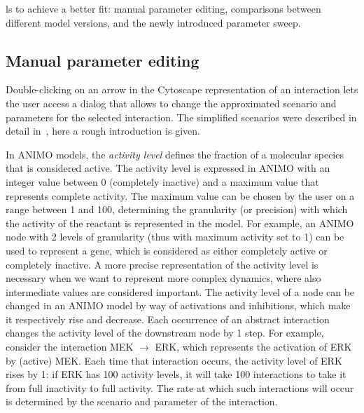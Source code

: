 \documentclass[submission,copyright,creativecommons]{eptcs}
\begin{document}
ls to achieve a better fit:
manual parameter editing, comparisons between different model versions, and the newly introduced parameter sweep.

\subsection{Manual parameter editing}\label{sec:parameter-editing}
Double-clicking on an arrow in the Cytoscape representation of an interaction lets the user access
a dialog that allows to change the approximated scenario and parameters for the selected interaction.
The simplified scenarios were described in detail in~\cite{animo-ieee}, here a rough introduction is given.

In ANIMO models, the \emph{activity level} defines the fraction of a molecular
species that is considered active.
The activity level is expressed in ANIMO with an integer value between
0 (completely inactive) and a maximum value that represents complete activity. The maximum value can
be chosen by the user on a range between 1 and 100, determining the granularity (or precision)
with which the activity of the reactant is represented in the model. For example, an ANIMO node
with 2 levels of granularity (thus with maximum activity set to 1) can be used to represent a gene, which is considered as either
completely active or completely inactive. A more precise representation of the activity level
is necessary when we want to represent more complex dynamics, where also intermediate values are considered
important. The activity level of a node can be changed in an ANIMO model by way of activations
and inhibitions, which make it respectively rise and decrease. Each occurrence of an abstract
interaction changes the activity level of the downstream node by 1 step. For example,
consider the interaction MEK $\rightarrow$ ERK, which represents the activation of ERK by (active) MEK.
Each time that interaction occurs, the activity level of ERK rises by 1: if ERK has 100 activity levels,
it will take 100 interactions to take it from full inactivity to full activity. The rate
at which such interactions will occur is determined by the scenario and parameter of the
interaction.
\end{document}
